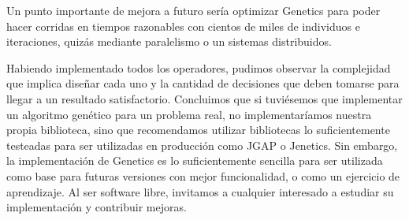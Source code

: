 \documentclass{conaiisi}
\begin{document}
\begin{multicols}{2}
{Un punto importante de mejora a futuro sería optimizar Genetics para poder hacer corridas en tiempos razonables con cientos de miles de individuos e iteraciones, quizás mediante paralelismo o un sistemas distribuidos.

Habiendo implementado todos los operadores, pudimos observar la complejidad que implica diseñar cada uno y la cantidad de decisiones que deben tomarse para llegar a un resultado satisfactorio.
Concluimos que si tuviésemos que implementar un algoritmo genético para un problema real, no implementaríamos nuestra propia biblioteca, sino que recomendamos utilizar bibliotecas lo suficientemente testeadas para ser utilizadas en producción como JGAP\cite{jgap} o Jenetics\cite{jenetics}.
Sin embargo, la implementación de Genetics es lo suficientemente sencilla para ser utilizada como base para futuras versiones con mejor funcionalidad, o como un ejercicio de aprendizaje.
Al ser software libre, invitamos a cualquier interesado a estudiar su implementación y contribuir mejoras.

}



\printbibliography[heading=subbibintoc]

\end{multicols}
\end{document}
